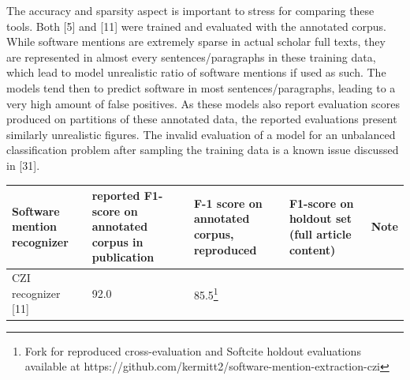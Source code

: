 \documentclass[
]{article}
\begin{document}
The accuracy and sparsity aspect is important to stress for comparing
these tools. Both {[}5{]} and {[}11{]} were trained and evaluated with
the annotated corpus. While software mentions are extremely sparse in
actual scholar full texts, they are represented in almost every
sentences/paragraphs in these training data, which lead to model
unrealistic ratio of software mentions if used as such. The models tend
then to predict software in most sentences/paragraphs, leading to a very
high amount of false positives. As these models also report evaluation
scores produced on partitions of these annotated data, the reported
evaluations present similarly unrealistic figures. The invalid
evaluation of a model for an unbalanced classification problem after
sampling the training data is a known issue discussed in {[}31{]}.

\begin{longtable}[]{@{}lllll@{}}
\toprule
\begin{minipage}[b]{0.18\columnwidth}\raggedright
Software mention recognizer\strut
\end{minipage} & \begin{minipage}[b]{0.18\columnwidth}\raggedright
reported F1-score on annotated corpus in publication\strut
\end{minipage} & \begin{minipage}[b]{0.18\columnwidth}\raggedright
F-1 score on annotated corpus, reproduced\strut
\end{minipage} & \begin{minipage}[b]{0.18\columnwidth}\raggedright
\textbf{F1-score on holdout set} (full article content)\strut
\end{minipage} & \begin{minipage}[b]{0.12\columnwidth}\raggedright
Note\strut
\end{minipage}\tabularnewline
\midrule
\endhead
\begin{minipage}[t]{0.18\columnwidth}\raggedright
CZI recognizer {[}11{]}\strut
\end{minipage} & \begin{minipage}[t]{0.18\columnwidth}\raggedright
92.0\strut
\end{minipage} & \begin{minipage}[t]{0.18\columnwidth}\raggedright
85.5\footnote{Fork for reproduced cross-evaluation and Softcite holdout
  evaluations available at
  https://github.com/kermitt2/software-mention-extraction-czi}\strut
\end{minipage} & \begin{minipage}[t]{0.18\columnwidth}\raggedright

\end{minipage}
\end{longtable}
\end{document}
